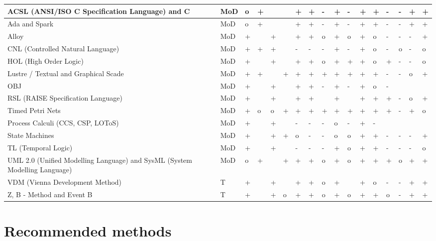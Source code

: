 \documentclass{./template/openetcs_report}
\begin{document}
{\begin{center}
\begin{landscape}
\begin{longtable}{|m{6cm}|m{0.8cm}|m{0.3cm}|m{0.3cm}|m{0.7cm}|m{0.3cm}|m{0.3cm}|m{0.7cm}|m{0.3cm}|m{0.3cm}|m{0.3cm}|m{0.3cm}|m{0.3cm}|m{0.7cm}|m{0.7cm}|m{0.7cm}|m{0.3cm}|}
ACSL (ANSI/ISO C Specification Language) and C&MoD&o&+&&&+&+&-&+&-&+&+&-&-&+&+ \\ \hline
Ada and Spark&MoD&o&+&&&+&+&-&+&-&+&+&-&-&+&+ \\ \hline
Alloy&MoD&+&&+&&+&+&o&+&o&+&o&-&-&-&+ \\ \hline
CNL (Controlled Natural Language)&MoD&+&+&+&&-&-&-&+&-&+&o&-&o&-&o \\ \hline
HOL (High Order Logic)&MoD&+&&+&&+&+&o&+&+&+&o&+&-&-&o \\ \hline
Lustre / Textual and Graphical Scade&MoD&+&+&&+&+&+&+&+&+&+&+&-&-&o&+ \\ \hline
OBJ&MoD&+&&+&&+&+&-&+&-&+&o&-&&& \\ \hline
RSL (RAISE Specification Language)&MoD&+& &+& &+&+& &+& &+&+&+&-&o&+\\ \hline
Timed Petri Nets&MoD&+&o&o&+&+&+&+&+&+&+&+&+&-&+&o\\ \hline
Process Calculi (CCS, CSP, LOToS)&MoD&+&&+&&-&-&-&o&-&+&-&&&& \\ \hline
State Machines&MoD&+&&+&+&o&-&-&o&o&+&+&-&-&-&+ \\ \hline
TL (Temporal Logic)&MoD&+&&+&&-&-&-&+&o&+&+&-&-&-&o \\ \hline
UML 2.0 (Unified Modelling Language) and SysML (System Modelling Language)&MoD&o&+&&+&+&+&o&+&o&+&+&+&o&+&+ \\ \hline
VDM (Vienna Development Method)&T&+&&+&&+&+&o&+&&+&o&-&-&+&+ \\ \hline
Z, B - Method and Event B&T&+&&+&o&+&+&o&+&o&+&+&o&-&+&+ \\ \hline


\end{longtable}

   \end{landscape}
\end{center}

\begin{tabbing}





\end{tabbing}

\chapter{Recommended methods}
\label{chap: method}



}
\end{document}
